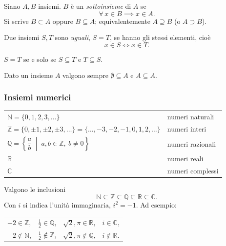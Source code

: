 \documentclass[11pt,a4paper]{article}
\begin{document}
\begin{definizione}
Siano $A, B$ insiemi. $B$ è un \emph{sottoinsieme} di $A$ se
\[
\forall\, x \in B \implies x \in A.
\]
Si scrive $B \subset A$ oppure $B \subseteq A$; equivalentemente
$A \supseteq B$ (o $A \supset B$).
\end{definizione}

\begin{definizione}
Due insiemi $S, T$ sono \emph{uguali}, $S = T$, se hanno gli stessi
elementi, cioè
\[
x \in S \iff x \in T.
\]
\end{definizione}

\begin{osservazione}
$S = T$ se e solo se $S \subseteq T$ e $T \subseteq S$.
\end{osservazione}

Dato un insieme $A$ valgono sempre $\emptyset \subseteq A$ e
$A \subseteq A$.

\subsubsection*{Insiemi numerici}

\begin{center}
\begin{tabular}{ll}
$\mathbb{N} = \{0, 1, 2, 3, \dots\}$ & numeri naturali \\
$\mathbb{Z} = \{0, \pm 1, \pm 2, \pm 3, \dots\}
              = \{\dots, -3, -2, -1, 0, 1, 2, \dots\}$ & numeri interi \\
$\mathbb{Q} = \left\{ \dfrac{a}{b} \;\middle|\; a, b \in \mathbb{Z},\
              b \neq 0 \right\}$ & numeri razionali \\
$\mathbb{R}$ & numeri reali \\
$\mathbb{C}$ & numeri complessi
\end{tabular}
\end{center}

Valgono le inclusioni
\[
\mathbb{N} \subseteq \mathbb{Z} \subseteq \mathbb{Q} \subseteq
\mathbb{R} \subseteq \mathbb{C}.
\]
Con $i$ si indica l'unità immaginaria, $i^2 = -1$. Ad esempio:
\begin{center}
\begin{tabular}{llll}
$-2 \in \mathbb{Z}$, & $\frac12 \in \mathbb{Q}$, &
$\sqrt{2}, \pi \in \mathbb{R}$, & $i \in \mathbb{C}$, \\
$-2 \notin \mathbb{N}$, & $\frac12 \notin \mathbb{Z}$, &
$\sqrt{2}, \pi \notin \mathbb{Q}$, & $i \notin \mathbb{R}$.
\end{tabular}
\end{center}
\end{document}
